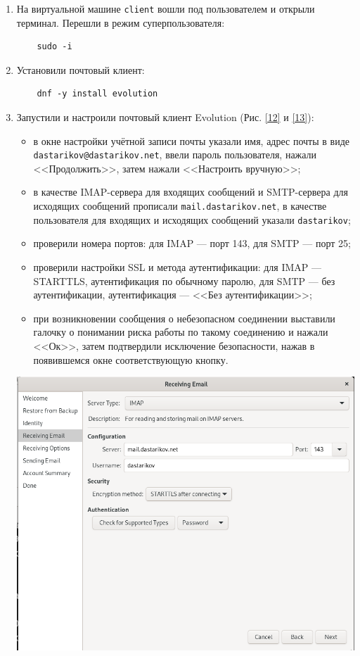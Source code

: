 \begin{enumerate}
\item На виртуальной машине \texttt{client} вошли под пользователем и открыли терминал. Перешли в режим суперпользователя:
  \begin{verbatim}
    sudo -i
  \end{verbatim}

\item Установили почтовый клиент:
  \begin{verbatim}
    dnf -y install evolution
  \end{verbatim}
\item Запустили и настроили почтовый клиент Evolution (Рис. \ref{12} и \ref{13}):
  \begin{itemize}
  \item в окне настройки учётной записи почты указали имя, адрес почты в виде \break \texttt{dastarikov@dastarikov.net}, ввели пароль пользователя, нажали <<Продолжить>>, затем нажали <<Настроить вручную>>;
  \item в качестве IMAP-сервера для входящих сообщений и SMTP-сервера для исходящих сообщений прописали \texttt{mail.dastarikov.net}, в качестве пользователя для входящих и исходящих сообщений указали \texttt{dastarikov};
  \item проверили номера портов: для IMAP — порт 143, для SMTP — порт 25;
  \item проверили настройки SSL и метода аутентификации: для IMAP — STARTTLS, аутентификация по обычному паролю, для SMTP — без аутентификации, аутентификация — <<Без аутентификации>>;
  \item при возникновении сообщения о небезопасном соединении выставили галочку о понимании риска работы по такому соединению и нажали <<Ок>>, затем подтвердили исключение безопасности, нажав в появившемся окне соответствующую кнопку.
\end{itemize}
\begin{center}
    \centering
    \includegraphics[width=\textwidth]{../images/image12.png}

\end{center}
\end{enumerate}
